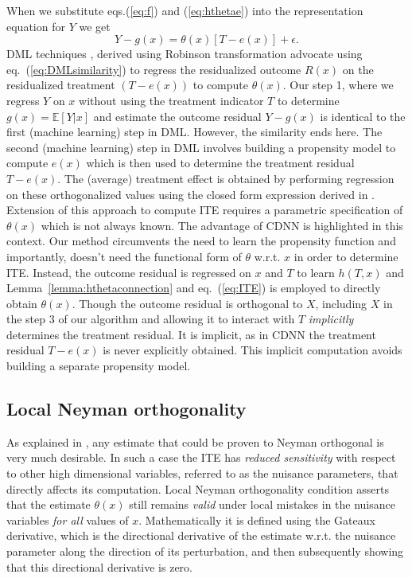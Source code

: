 \documentclass[sigconf]{acmart}
\theoremstyle{plain}
\numberwithin{equation}{section}
\begin{document}
When we substitute eqs.(\ref{eq:f}) and (\ref{eq:hthetae}) into the representation equation for $Y$ we get 
\begin{equation}
\label{eq:DMLsimilarity}
Y - g(x) =  \theta(x) \left[T-e(x)\right] + \epsilon.
\end{equation}
DML techniques \cite{doubleMLdebiased}, \cite{doubleML} derived using Robinson transformation advocate using eq.~(\ref{eq:DMLsimilarity}) to regress the residualized outcome $R(x)$ on the residualized treatment $\left(T-e(x)\right)$ to compute $\theta(x)$. Our step 1, where we regress $Y$ on $x$ without using the treatment indicator $T$ to determine $g(x) =  \mathbb{E}\left[Y | x\right]$ and estimate the outcome residual $Y-g(x)$ is identical to the first (machine learning) step in DML. However, the similarity ends here. The second (machine learning) step in DML involves building a propensity model to compute $e(x)$ which is then used to determine the treatment residual $T-e(x)$. The (average) treatment effect is obtained by performing regression on these orthogonalized values using the closed form expression derived in \cite{doubleML}. Extension of this approach to compute ITE requires a parametric specification of $\theta(x)$ \cite{chernozhukovsemiparametric} which is not always known. The advantage of CDNN is highlighted in this context. Our method circumvents the need to learn the propensity function and importantly, doesn't need the functional form of $\theta$ w.r.t. $x$ in order to determine ITE. Instead, the outcome residual is regressed on $x$ and $T$ to learn $h(T,x)$ and Lemma~\ref{lemma:hthetaconnection} and eq.~(\ref{eq:ITE}) is employed to directly obtain $\theta(x)$. Though the outcome residual is orthogonal to $X$, including $X$ in the step 3 of our algorithm and allowing it to interact with $T$ \emph{implicitly} determines the treatment residual. It is implicit, as in CDNN the treatment residual $T-e(x)$ is never explicitly obtained. This implicit computation avoids building a separate propensity model.

\subsection{Local Neyman orthogonality}
As explained in \cite{doubleML, OrthogonalRandomForest}, any estimate that could be proven to Neyman orthogonal is very much desirable. In such a case the ITE has \emph{reduced sensitivity} with respect to other high dimensional variables, referred to as the nuisance parameters, that directly affects its computation. Local Neyman orthogonality condition asserts that the estimate $\theta(x)$ still remains \emph{valid} under local mistakes in the nuisance variables \emph{for all} values of $x$. Mathematically it is defined using the Gateaux derivative, which is the directional derivative of the estimate w.r.t. the nuisance parameter along the direction of its perturbation, and then subsequently showing that this directional derivative is zero.
\end{document}
